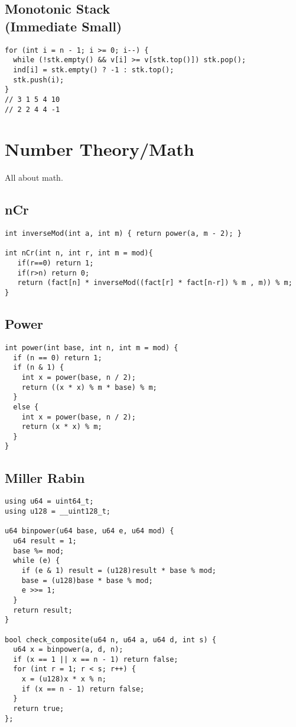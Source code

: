 \documentclass[10pt, a4paper]{article}
\begin{document}
\begin{multicols}{2}
\subsection{Monotonic Stack\\(Immediate Small)}
\begin{lstlisting}
for (int i = n - 1; i >= 0; i--) {
  while (!stk.empty() && v[i] >= v[stk.top()]) stk.pop();
  ind[i] = stk.empty() ? -1 : stk.top();
  stk.push(i);
}
// 3 1 5 4 10
// 2 2 4 4 -1
\end{lstlisting}

\section{Number Theory/Math}
All about math.
\subsection{nCr}
\begin{lstlisting}
int inverseMod(int a, int m) { return power(a, m - 2); }

int nCr(int n, int r, int m = mod){
   if(r==0) return 1;
   if(r>n) return 0;
   return (fact[n] * inverseMod((fact[r] * fact[n-r]) % m , m)) % m;
}
\end{lstlisting}
\subsection{Power}
\begin{lstlisting}
int power(int base, int n, int m = mod) {
  if (n == 0) return 1;
  if (n & 1) {
    int x = power(base, n / 2);
    return ((x * x) % m * base) % m;
  }
  else {
    int x = power(base, n / 2);
    return (x * x) % m;
  }
}
\end{lstlisting}
\subsection{Miller Rabin}
\begin{lstlisting}
using u64 = uint64_t;
using u128 = __uint128_t;

u64 binpower(u64 base, u64 e, u64 mod) {
  u64 result = 1;
  base %= mod;
  while (e) {
    if (e & 1) result = (u128)result * base % mod;
    base = (u128)base * base % mod;
    e >>= 1;
  }
  return result;
}

bool check_composite(u64 n, u64 a, u64 d, int s) {
  u64 x = binpower(a, d, n);
  if (x == 1 || x == n - 1) return false;
  for (int r = 1; r < s; r++) {
    x = (u128)x * x % n;
    if (x == n - 1) return false;
  }
  return true;
};


\end{lstlisting}
\end{multicols}
\end{document}
